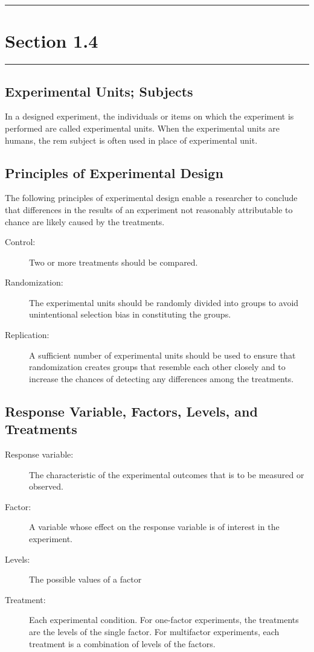 \documentclass[12pt]{article}
\begin{document}
    \noindent\rule{\textwidth}{0.4pt}
    \section*{Section 1.4}
    \noindent\rule{\textwidth}{0.4pt}
        \subsection*{Experimental Units; Subjects}
            In a designed experiment, the individuals or items on which the experiment
            is performed are called experimental units. When the experimental units are
            humans, the rem subject is often used in place of experimental unit.
        \subsection*{Principles of Experimental Design}
            The following principles of experimental design enable a researcher to
            conclude that differences in the results of an experiment not reasonably
            attributable to chance are likely caused by the treatments.
            \begin{description}
                \item[Control:] Two or more treatments should be compared.
                \item[Randomization:] The experimental units should be randomly divided
                into groups to avoid unintentional selection bias in constituting the
                groups.
                \item[Replication:] A sufficient number of experimental units should be
                used to ensure that randomization creates groups that resemble each other
                closely and to increase the chances of detecting any differences among the
                treatments.   
            \end{description}
        \subsection*{Response Variable, Factors, Levels, and Treatments}
            \begin{description}
                \item[Response variable:] The characteristic of the experimental outcomes
                that is to be measured or observed.
                \item[Factor:] A variable whose effect on the response variable is of
                interest in the experiment.
                \item[Levels:] The possible values of a factor  
                \item[Treatment:] Each experimental condition. For one-factor experiments,
                the treatments are the levels of the single factor. For multifactor
                experiments, each treatment is a combination of levels of the factors.
            \end{description}
\end{document}
